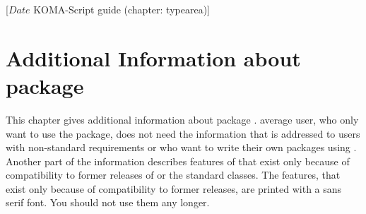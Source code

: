 %
%
%
%
%
%
%
%
% 
%
%
%
%

                 [$Date$
                  KOMA-Script guide (chapter: typearea)]


\chapter{Additional Information about package }
\BeginIndexGroup
{}


This chapter gives additional information about package
.  average user, who only want to use the package,
does not need the information that is addressed to users with non-standard
requirements or who want to write their own packages using
. Another part of the information describes features of
 that exist only because of compatibility to former releases
of \KOMAScript{} or the standard classes. The features, that exist only
because of compatibility to former \KOMAScript{} releases, are printed with a
sans serif font. You should not use them any longer.


